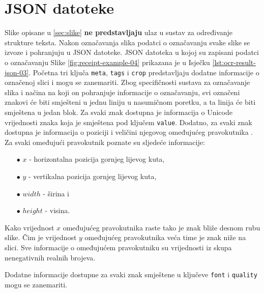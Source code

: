 \documentclass[times, utf8, zavrsni]{fer}
\begin{document}
\section{JSON datoteke}
Slike opisane u \ref{sec:slike} \textbf{ne predstavljaju} ulaz u sustav za određivanje strukture
teksta. Nakon označavanja slika podatci o označavanju svake slike se izvoze i pohranjuju u JSON datoteke.
JSON datoteka u kojoj su zapisani podatci o označavanju Slike \ref{fig:receipt-example-04}
prikazana je u Isječku \ref{lst:ocr-result-json-03}. Početna tri ključa
\lstinline{meta}, \lstinline{tags} i \lstinline{crop} predstavljaju dodatne informacije
o označenoj slici i mogu se zanemariti. Zbog specifičnosti sustava za označavanje
slika i načina na koji on pohranjuje informacije o označavanju, svi označeni
znakovi će biti smješteni u jednu liniju u nasumičnom poretku, a ta linija
će biti smještena u jedan blok. Za svaki znak dostupna je informacija o Unicode
vrijednosti znaka koja je smještena pod ključem \lstinline{value}. Dodatno, za
svaki znak dostupna je informacija o poziciji i veličini njegovog omeđujućeg pravokutnika
. Za svaki omeđujući pravokutnik poznate su sljedeće informacije:
\begin{itemize}
    \item[$\bullet$] $x$ - horizontalna pozicija gornjeg lijevog kuta,
    \item[$\bullet$] $y$ - vertikalna pozicija gornjeg lijevog kuta,
    \item[$\bullet$] $width$ - širina i
    \item[$\bullet$] $height$ - visina.
\end{itemize}

Kako vrijednost $x$ omeđujućeg pravokutnika raste tako je znak bliže desnom rubu slike.
Čim je vrijednost $y$ omeđujućeg pravokutnika veća time je znak niže na slici.
Sve informacije o omeđujućem pravokutniku su vrijednosti iz skupa nenegativnih realnih
brojeva.

Dodatne informacije dostupne za svaki znak smještene u ključeve
\lstinline{font} i \lstinline{quality} mogu se zanemariti.

\
\end{document}
